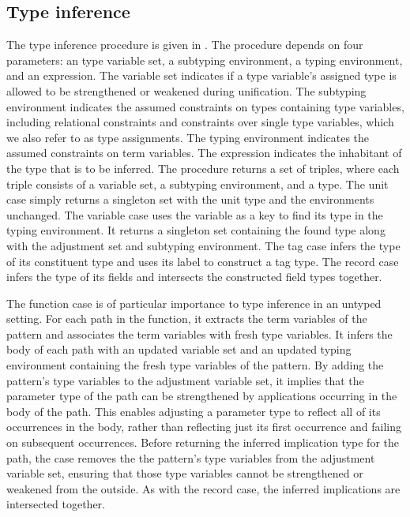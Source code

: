 \documentclass[acmsmall]{acmart}
\theoremstyle{definition}
\begin{document}

\subsection{Type inference}
The type inference procedure is given in .
The procedure depends on four parameters: an type variable set, a subtyping environment, 
a typing environment, and an expression.
The variable set indicates if a type variable's assigned type is allowed to be strengthened or weakened  
during unification.
The subtyping environment indicates the assumed constraints on types containing type variables,
including relational constraints and constraints over single type variables, 
which we also refer to as type assignments.
The typing environment indicates the assumed constraints on term variables.
The expression indicates the inhabitant of the type that is to be inferred.
The procedure returns a set of triples, where each triple consists of a variable set, a subtyping environment,
and a type.
The unit case simply returns a singleton set with the unit type and the environments unchanged. 
The variable case uses the variable as a key to find its type in the typing environment. 
It returns a singleton set containing the found type along with the adjustment set and subtyping environment.
The tag case infers the type of its constituent type and uses its label to construct a tag type.
The record case infers the type of its fields and intersects the constructed field types together.

The function case is of particular importance to type inference in an untyped setting.
For each path in the function, it extracts the term variables of the pattern and associates 
the term variables with fresh type variables. It infers the body of each path 
with an updated variable set and an updated typing environment containing the fresh
type variables of the pattern. By adding the pattern's type variables to the adjustment variable set,
it implies that the parameter type of the path can be strengthened by applications
occurring in the body of the path. This enables adjusting a parameter type to reflect all of its 
occurrences in the body, 
rather than reflecting just its first occurrence and failing on subsequent occurrences. 
Before returning the inferred implication type for the path, the case removes
the the pattern's type variables from the adjustment variable set, ensuring
that those type variables cannot be strengthened or weakened from the outside. 
As with the record case, the inferred implications are intersected together.
\end{document}
